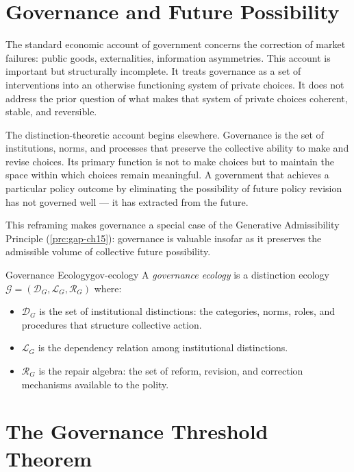 \documentclass[12pt,twoside,openright]{book}
\begin{document}
\section{Governance and Future Possibility}

The standard economic account of government concerns
the correction of market failures: public goods,
externalities, information asymmetries. This account
is important but structurally incomplete. It treats
governance as a set of interventions into an otherwise
functioning system of private choices. It does not
address the prior question of what makes that system
of private choices coherent, stable, and reversible.

The distinction-theoretic account begins elsewhere.
Governance is the set of institutions, norms, and
processes that preserve the collective ability to make
and revise choices. Its primary function is not to
make choices but to maintain the space within which
choices remain meaningful. A government that achieves
a particular policy outcome by eliminating the
possibility of future policy revision has not governed
well — it has extracted from the future.

This reframing makes governance a special case of
the Generative Admissibility Principle
(\cref{prc:gap-ch15}): governance is valuable insofar
as it preserves the admissible volume of collective
future possibility.

\begin{definition}{Governance Ecology}{gov-ecology}
  A \emph{governance ecology} is a distinction ecology
  $\mathcal{G} = (\mathcal{D}_G, \mathcal{L}_G,
  \mathcal{R}_G)$ where:
  \begin{itemize}[nosep]
    \item $\mathcal{D}_G$ is the set of institutional
          distinctions: the categories, norms, roles,
          and procedures that structure collective action.
    \item $\mathcal{L}_G$ is the dependency relation
          among institutional distinctions.
    \item $\mathcal{R}_G$ is the repair algebra:
          the set of reform, revision, and correction
          mechanisms available to the polity.
  \end{itemize}
\end{definition}

\section{The Governance Threshold Theorem}
\end{document}
